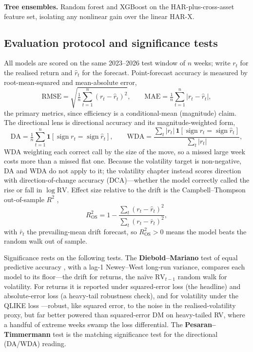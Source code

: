 \documentclass[12pt, a4paper]{article}
\begin{document}
\textbf{Tree ensembles.} Random forest and XGBoost on the HAR-plus-cross-asset feature
set, isolating any nonlinear gain over the linear HAR-X.

\subsection{Evaluation protocol and significance tests}
\label{sec:method-eval}

All models are scored on the same 2023--2026 test window of \(n\) weeks; write \(r_t\) for the
realised return and \(\hat r_t\) for the forecast. Point-forecast accuracy is measured by
root-mean-squared and mean-absolute error,
\begin{equation}
    \mathrm{RMSE} = \sqrt{\tfrac1n \textstyle\sum_{t=1}^{n} (r_t - \hat r_t)^2}, \qquad
    \mathrm{MAE}  = \tfrac1n \textstyle\sum_{t=1}^{n} \lvert r_t - \hat r_t\rvert ,
\end{equation}
the primary metrics, since efficiency is a conditional-mean (magnitude) claim. The directional
lens is directional accuracy and its magnitude-weighted form,
\begin{equation}
    \mathrm{DA} = \tfrac1n \textstyle\sum_{t=1}^{n}
        \mathbf{1}\!\left[\operatorname{sign} r_t = \operatorname{sign}\hat r_t\right],
    \qquad
    \mathrm{WDA} = \frac{\sum_{t} \lvert r_t\rvert\,
        \mathbf{1}\!\left[\operatorname{sign} r_t = \operatorname{sign}\hat r_t\right]}
        {\sum_{t} \lvert r_t\rvert} ,
\end{equation}
WDA weighting each correct call by the size of the move, so a missed large week costs more than
a missed flat one. Because the volatility target is non-negative, DA and WDA do not apply to it;
the volatility chapter instead scores direction with direction-of-change accuracy (DCA)---whether
the model correctly called the rise or fall in \(\log\mathrm{RV}\). Effect size relative to the
drift is the Campbell--Thompson out-of-sample \(R^2\) \parencite{campbell2008},
\begin{equation}
    R^2_{\text{OS}} = 1 - \frac{\sum_{t}(r_t - \hat r_t)^2}{\sum_{t}(r_t - \bar r_t)^2} ,
\end{equation}
with \(\bar r_t\) the prevailing-mean drift forecast, so \(R^2_{\text{OS}}>0\) means the model
beats the random walk out of sample.

Significance rests on the following tests. The \textbf{Diebold--Mariano} test of equal predictive
accuracy \parencite{diebold1995}, with a lag-1 Newey--West \parencite{newey1987} long-run
variance, compares each model to its
floor---the drift for returns, the na\"ive \(\mathrm{RV}_{t-1}\) random walk for
volatility. For returns it is reported under squared-error loss (the headline) and
absolute-error loss (a heavy-tail robustness check), and for volatility under the
QLIKE loss \parencite{patton2011}---robust, like squared error, to the noise in the
realised-volatility proxy, but far better powered than squared-error DM on heavy-tailed RV,
where a handful of extreme weeks swamp the loss differential. The \textbf{Pesaran--Timmermann} test
\parencite{pesaran1992} is the matching significance test for the directional (DA/WDA)
reading.
\end{document}

